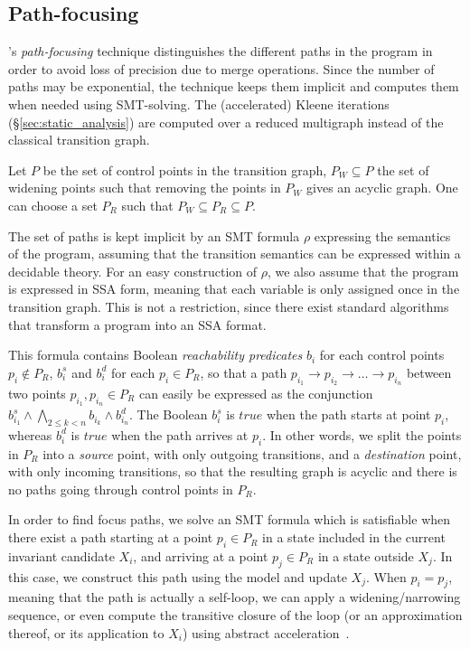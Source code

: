 \documentclass[preprint]{sigplanconf}
\begin{document}
\subsection{Path-focusing}
\label{sec:path_focusing}

\citet{Monniaux_Gonnord_SAS11}'s \emph{path-focusing} technique
distinguishes the different paths in the program in order to avoid loss of
precision due to merge operations. Since the number of paths may be exponential,
the technique keeps them implicit and computes them when needed using
SMT-solving.
The (accelerated) Kleene iterations (\S\ref{sec:static_analysis}) are computed over a reduced multigraph instead of the classical transition graph.

Let $P$ be the set of control points in the transition graph, 
$P_W \subseteq P$ the set of widening points
such that removing the points in $P_W$ gives an acyclic graph.
One can choose a set $P_R$ such that $P_W \subseteq P_R \subseteq P$.

The set of paths is kept implicit by an SMT formula $\rho$ expressing
the semantics of the program, assuming that the transition semantics can be
expressed within a decidable theory. For an easy construction of $\rho$, 
we also assume that the program is expressed in SSA form, meaning that each
variable is only assigned once in the transition graph. This is not a
restriction, since there exist standard algorithms that transform a program into
an SSA format.

This formula contains Boolean \emph{reachability predicates} $b_i$ for each
control points $p_i \notin P_R$, $b_i^s$ and $b_i^d$ for each $p_i \in P_R$, so
that a path 
$p_{i_1} \rightarrow p_{i_2} \rightarrow \dots \rightarrow p_{i_n}$ 
between two points $p_{i_1}, p_{i_n} \in P_R$ 
can easily be expressed as the
conjunction $b_{i_1}^s \wedge \bigwedge_{2 \leq k < n} b_{i_k} \wedge b_{i_n}^d$.
The Boolean $b_{i}^s$ is $true$ when the path starts at point $p_i$, whereas
$b_i^d$ is $true$ when the path arrives at $p_i$. In other words, we split the
points in $P_R$ into a \emph{source} point, with only outgoing transitions, and
a \emph{destination} point, with only incoming transitions, so that the
resulting graph is acyclic and there is no paths going through control
points in $P_R$.

In order to find focus paths, we solve an SMT formula which is satisfiable when
there exist a path starting at a point $p_i \in P_R$ in a state included in the
current invariant candidate $X_i$, and arriving at a point $p_j \in P_R$ in a
state outside $X_j$. In this case, we construct this path using the model and
update $X_j$. When $p_i = p_j$, meaning that the path is actually a self-loop,
we can apply a widening/narrowing sequence, or even compute the transitive
closure of the loop (or an approximation thereof, or its application to $X_i$)
using abstract acceleration~\cite{DBLP:conf/sas/GonnordH06}.
\end{document}
